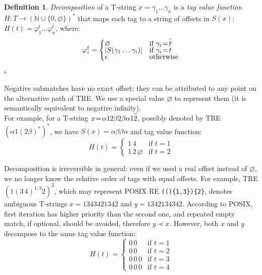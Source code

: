 \documentclass{article}
\newcommand{\Xeq}{\!=\!}
\newcommand{\YN}{\mathbb{N}}
\newcommand*{\Xbar}[1]{\overline{#1\vphantom{\bar{#1}}}}
\theoremstyle{definition}
\newtheorem{Xdef}{Definition}
\begin{document}
\begin{multicols}{2}
    \begin{Xdef}\label{tagvalfun}
    \emph{Decomposition} of a T-string $x \Xeq \gamma_1 \dots \gamma_n$
    is a \emph{tag value function} $H: T \rightarrow (\YN \cup \{ 0, \varnothing \})^*$
    that maps each tag to a string of offsets in $S(x)$:
    $H(t) \Xeq \varphi^t_1 \dots \varphi^t_n$, where:
    $$\varphi^t_i = \begin{cases}
            \varnothing &\text{if } \gamma_i \Xeq \Xbar{t} \\[-0.5em]
            |S(\gamma_1 \dots \gamma_i)| &\text{if } \gamma_i \Xeq t \\[-0.5em]
            \epsilon &\text{otherwise}
        \end{cases}$$
    $\square$
    \end{Xdef}

Negative submatches have no exact offset: they can be attributed to any point on the alternative path of TRE.
We use a special value $\varnothing$ to represent them
(it is semantically equivalent to negative infinity).
\\

For example, for a T-string $x \Xeq \alpha 1 2 \beta 2 \beta \alpha 1 \Xbar{2}$,
possibly denoted by TRE $(\alpha 1 (2 \beta)^*)^*$, we have
$S(x) \Xeq \alpha \beta \beta \alpha$ and tag value function:
    $$H(t) \Xeq \begin{cases}
        1 \, 4 &\text{if } t \Xeq 1 \\[-0.5em]
        1 \, 2 \, \varnothing &\text{if } t \Xeq 2
    \end{cases}$$

Decomposition is irreversible in general:
even if we used a real offset instead of $\varnothing$, we no longer know the relative order of tags with equal offsets.
For example, TRE $(1 (3 \, 4)^{1,3} 2)^{2}$,
which may represent POSIX RE \texttt{(()\{1,3\})\{2\}},
denotes ambiguous T-strings $x \Xeq 1 3 4 3 4 2 1 3 4 2$ and $y \Xeq 1 3 4 2 1 3 4 3 4 2$.
According to POSIX, first iteration has higher priority than the second one,
and repeated empty match, if optional, should be avoided, therefore $y \prec x$.
However, both $x$ and $y$ decompose to the same tag value function:
    $$H(t) \Xeq \begin{cases}
        0 \, 0 &\text{if } t \Xeq 1 \\[-0.5em]
        0 \, 0 &\text{if } t \Xeq 2 \\[-0.5em]
        0 \, 0 \, 0 &\text{if } t \Xeq 3\\[-0.5em]
        0 \, 0 \, 0 &\text{if } t \Xeq 4
    \end{cases}$$


\end{multicols}
\end{document}
